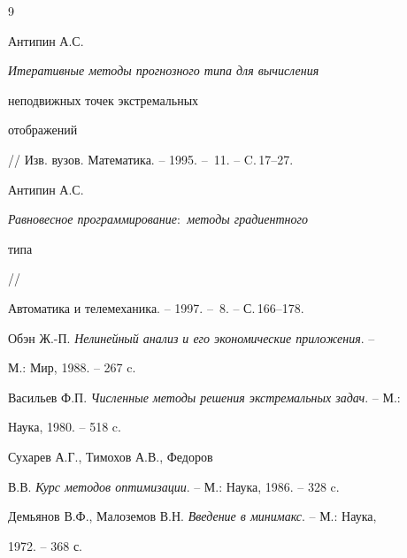\begin{thebibliography}{9}







Антипин А.С. {\em Итеративные методы прогнозного типа для вычисления


неподвижных точек экстремальных


отображений} // Изв. вузов. Математика. -- 1995. -- \No\,11. -- C.\,17--27.




Антипин А.С. {\em Равновесное программирование$:$ методы градиентного


типа} //


Автоматика и телемеханика. -- 1997. -- \No\,8. -- С.\,166--178.




Обэн Ж.-П. {\em Нелинейный анализ и его экономические приложения}. --


М.: Мир, 1988. -- 267 c.




Васильев Ф.П. {\em Численные методы решения экстремальных задач}. -- М.:


Наука, 1980. -- 518 c.




Сухарев А.Г., Тимохов А.В., Федоров


В.В. {\em Курс методов оптимизации}. -- М.: Наука, 1986. -- 328 c.




Демьянов В.Ф., Малоземов В.Н. {\em Введение в минимакс}. -- М.: Наука,


1972. -- 368 с.





\end{thebibliography}





\vskip 2cm














\label{end}





